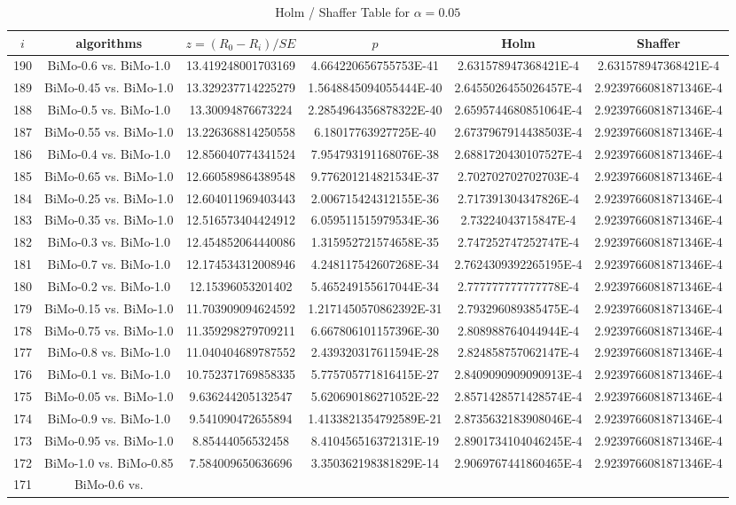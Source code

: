 \documentclass[a4paper,10pt]{article}
\begin{document}
\begin{landscape}
\begin{table}[!htp]
\centering\tiny
\caption{Holm / Shaffer Table for $\alpha=0.05$}
\begin{tabular}{cccccc}
$i$&algorithms&$z=(R_0 - R_i)/SE$&$p$&Holm&Shaffer\\
\hline
190&BiMo-0.6 vs. BiMo-1.0&13.419248001703169&4.664220656755753E-41&2.631578947368421E-4&2.631578947368421E-4\\189&BiMo-0.45 vs. BiMo-1.0&13.329237714225279&1.5648845094055444E-40&2.6455026455026457E-4&2.9239766081871346E-4\\188&BiMo-0.5 vs. BiMo-1.0&13.30094876673224&2.2854964356878322E-40&2.6595744680851064E-4&2.9239766081871346E-4\\187&BiMo-0.55 vs. BiMo-1.0&13.226368814250558&6.18017763927725E-40&2.6737967914438503E-4&2.9239766081871346E-4\\186&BiMo-0.4 vs. BiMo-1.0&12.856040774341524&7.954793191168076E-38&2.6881720430107527E-4&2.9239766081871346E-4\\185&BiMo-0.65 vs. BiMo-1.0&12.660589864389548&9.776201214821534E-37&2.702702702702703E-4&2.9239766081871346E-4\\184&BiMo-0.25 vs. BiMo-1.0&12.604011969403443&2.006715424312155E-36&2.717391304347826E-4&2.9239766081871346E-4\\183&BiMo-0.35 vs. BiMo-1.0&12.516573404424912&6.059511515979534E-36&2.73224043715847E-4&2.9239766081871346E-4\\182&BiMo-0.3 vs. BiMo-1.0&12.454852064440086&1.315952721574658E-35&2.747252747252747E-4&2.9239766081871346E-4\\181&BiMo-0.7 vs. BiMo-1.0&12.174534312008946&4.248117542607268E-34&2.7624309392265195E-4&2.9239766081871346E-4\\180&BiMo-0.2 vs. BiMo-1.0&12.15396053201402&5.465249155617044E-34&2.777777777777778E-4&2.9239766081871346E-4\\179&BiMo-0.15 vs. BiMo-1.0&11.703909094624592&1.2171450570862392E-31&2.793296089385475E-4&2.9239766081871346E-4\\178&BiMo-0.75 vs. BiMo-1.0&11.359298279709211&6.667806101157396E-30&2.808988764044944E-4&2.9239766081871346E-4\\177&BiMo-0.8 vs. BiMo-1.0&11.040404689787552&2.439320317611594E-28&2.824858757062147E-4&2.9239766081871346E-4\\176&BiMo-0.1 vs. BiMo-1.0&10.752371769858335&5.775705771816415E-27&2.8409090909090913E-4&2.9239766081871346E-4\\175&BiMo-0.05 vs. BiMo-1.0&9.636244205132547&5.620690186271052E-22&2.8571428571428574E-4&2.9239766081871346E-4\\174&BiMo-0.9 vs. BiMo-1.0&9.541090472655894&1.4133821354792589E-21&2.8735632183908046E-4&2.9239766081871346E-4\\173&BiMo-0.95 vs. BiMo-1.0&8.85444056532458&8.410456516372131E-19&2.8901734104046245E-4&2.9239766081871346E-4\\172&BiMo-1.0 vs. BiMo-0.85&7.584009650636696&3.350362198381829E-14&2.9069767441860465E-4&2.9239766081871346E-4\\171&BiMo-0.6 vs. 
\end{tabular}
\end{table}
\end{landscape}
\end{document}
